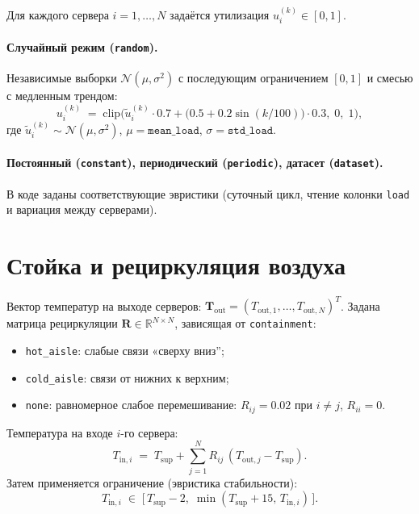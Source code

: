 \documentclass[12pt,a4paper]{article}
\begin{document}
Для каждого сервера $i=1,\ldots,N$ задаётся утилизация $u_i^{(k)}\in[0,1]$.

\paragraph{Случайный режим (\texttt{random}).}
Независимые выборки $\mathcal{N}(\mu,\sigma^2)$ с последующим ограничением $[0,1]$ и смесью с медленным трендом:
\begin{equation}
  u_i^{(k)} \;=\; \mathrm{clip}\Big( \tilde u_i^{(k)} \cdot 0.7 + \big(0.5 + 0.2\sin(k/100)\big)\cdot 0.3,\; 0,\; 1 \Big),
\end{equation}
где $\tilde u_i^{(k)} \sim \mathcal{N}(\mu,\sigma^2)$, $\mu = \texttt{mean\_load}$, $\sigma = \texttt{std\_load}$.

\paragraph{Постоянный (\texttt{constant}), периодический (\texttt{periodic}), датасет (\texttt{dataset}).}
В коде заданы соответствующие эвристики (суточный цикл, чтение колонки \texttt{load} и вариация между серверами).

\section{Стойка и рециркуляция воздуха}

Вектор температур на выходе серверов: $\mathbf{T}_{\mathrm{out}} = (T_{\mathrm{out},1},\ldots,T_{\mathrm{out},N})^T$.
Задана матрица рециркуляции $\mathbf{R}\in\mathbb{R}^{N\times N}$, зависящая от \texttt{containment}:
\begin{itemize}[leftmargin=*]
  \item \texttt{hot\_aisle}: слабые связи «сверху вниз'';
  \item \texttt{cold\_aisle}: связи от нижних к верхним;
  \item \texttt{none}: равномерное слабое перемешивание: $R_{ij} = 0.02$ при $i\neq j$, $R_{ii}=0$.
\end{itemize}

Температура на входе $i$-го сервера:
\begin{equation}
  T_{\mathrm{in},i} \;=\; T_{\mathrm{sup}} + \sum_{j=1}^{N} R_{ij}\,(T_{\mathrm{out},j} - T_{\mathrm{sup}}).
\end{equation}
Затем применяется ограничение (эвристика стабильности):
\begin{equation}
  T_{\mathrm{in},i} \;\in\; \big[\,T_{\mathrm{sup}}-2,\; \min(T_{\mathrm{sup}}+15,\, T_{\mathrm{in},i})\,\big].
\end{equation}
\end{document}
